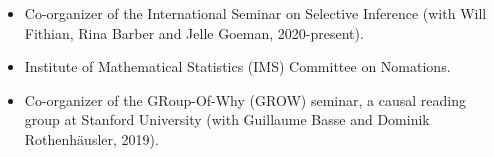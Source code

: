 \documentclass{article}
\begin{document}
\begin{itemize}
\item Co-organizer of the International Seminar on Selective Inference (with Will Fithian, Rina Barber and Jelle Goeman, 2020-present).
\item Institute of Mathematical Statistics (IMS) Committee on Nomations.
\item Co-organizer of the GRoup-Of-Why (GROW) seminar, a causal reading group at Stanford University (with Guillaume Basse and Dominik Rothenhäusler, 2019).
\end{itemize}
\end{document}
